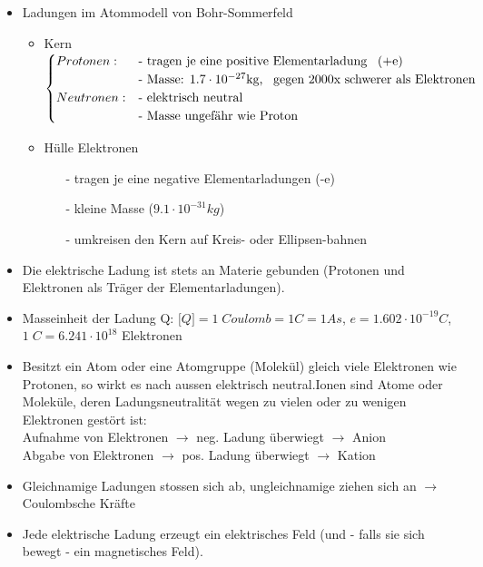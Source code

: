 \begin{itemize}
	\item Ladungen im Atommodell von Bohr-Sommerfeld\\
	\begin{itemize}
			\item Kern 
			$\begin{cases}
				Protonen:  & \text{- tragen je eine positive Elementarladung \, (+e)}\\ & \text{- Masse: $1.7 \cdot 10^{-27}$kg, \, gegen 2000x schwerer als 					Elektronen}\\
				Neutronen: & \text{- elektrisch neutral}\\ & \text{- Masse ungefähr wie Proton}
			\end{cases}$\\
			\item Hülle Elektronen
			\begin{itemize}
				\item[-] tragen je eine negative Elementarladungen (-e)\\
				\item[-] kleine Masse ($9.1 \cdot 10^{-31}kg$)\\
				\item[-] umkreisen den Kern auf Kreis- oder Ellipsen-bahnen\\
			\end{itemize}
		\end{itemize}
	\item Die elektrische Ladung ist stets an Materie gebunden (Protonen und Elektronen als Träger
der Elementarladungen).
	\item Masseinheit der Ladung Q: $ \lbrack Q \rbrack = 1  \;Coulomb = 1 C = 1 As$, $ e = 1.602\cdot 10^{-19} C$, $1 \; C = 6.241\cdot 10^{18}$ Elektronen
	\item Besitzt ein Atom oder eine Atomgruppe (Molekül) gleich viele Elektronen wie Protonen, so wirkt es nach aussen elektrisch neutral.Ionen sind Atome oder Moleküle, deren Ladungsneutralität wegen zu vielen oder zu wenigen Elektronen gestört ist:\\
				Aufnahme von Elektronen $\rightarrow$ neg. Ladung überwiegt $\rightarrow$ Anion\\
				Abgabe von Elektronen $\rightarrow$ pos. Ladung überwiegt $\rightarrow$ Kation\\
	\item Gleichnamige Ladungen stossen sich ab, ungleichnamige ziehen sich an $\rightarrow$ Coulombsche Kräfte 
	\item Jede elektrische Ladung erzeugt ein elektrisches Feld (und - falls sie sich bewegt - ein magnetisches Feld).\\
\end{itemize}

